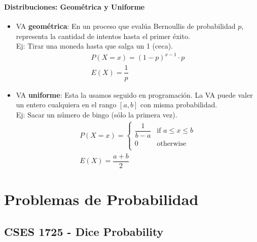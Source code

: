 \documentclass{beamer}
\begin{document}
\begin{frame}
  \frametitle{\SECTIONA}
  \framesubtitle{Distribuciones: Geométrica y Uniforme}

  \begin{itemize}
    \item VA \textbf{geométrica}: En un proceso que evalúa Bernoullis de probabilidad \(p\), representa la cantidad de intentos hasta el primer éxito. \\
      Ej: Tirar una moneda hasta que salga un 1 (ceca).
      \begin{gather*}
        P(X = x) = (1 - p)^{x - 1} \cdot p \\
        E(X) = \dfrac{1}{p}
      \end{gather*}
    \item<2-> VA \textbf{uniforme}: Esta la usamos seguido en programación. La VA puede valer un entero cualquiera en el rango \([a, b]\) con misma probabilidad. \\
      Ej: Sacar un número de bingo (sólo la primera vez).
      \begin{gather*}
        P(X = x) = \begin{cases} \dfrac{1}{b - a} & \text{if } a \leq x \leq b \\ 0 & \text{otherwise} \\ \end{cases} \\
        E(X) = \dfrac{a + b}{2}
      \end{gather*}
  \end{itemize}
\end{frame}

\newcommand{\SECTIONB}{Problemas de Probabilidad}
\section{\SECTIONB}
\newcommand{\EJA}{\href{https://cses.fi/problemset/task/1725/}{CSES 1725 - Dice Probability}}

\subsection{CSES 1725 - Dice Probability}
\end{document}
